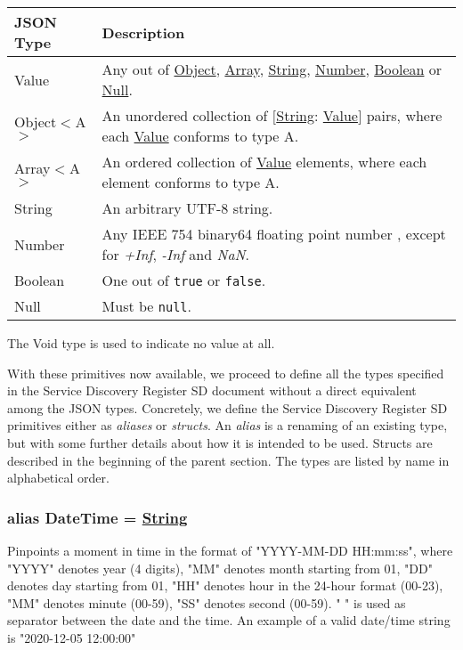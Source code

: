 \documentclass[a4paper]{arrowhead}
\newcommand{\pdef}[1]{{\textcolor{ArrowheadGrey}{#1\label{sec:model:primitives:#1}\label{sec:model:primitives:#1s}}}}
\newcommand{\pref}[1]{{\textcolor{ArrowheadGrey}{\hyperref[sec:model:primitives:#1]{#1}}}}
\begin{document}
\begin{table}[ht!]
\begin{tabularx}{\textwidth}{| p{3cm} | X |} \hline
\rowcolor{gray!33} JSON Type & Description \\ \hline
\pdef{Value}                 & Any out of \pref{Object}, \pref{Array}, \pref{String}, \pref{Number}, \pref{Boolean} or \pref{Null}. \\ \hline
\pdef{Object}$<$A$>$         & An unordered collection of $[$\pref{String}: \pref{Value}$]$ pairs, where each \pref{Value} conforms to type A. \\ \hline
\pdef{Array}$<$A$>$          & An ordered collection of \pref{Value} elements, where each element conforms to type A. \\ \hline
\pdef{String}                & An arbitrary UTF-8 string. \\ \hline
\pdef{Number}                & Any IEEE 754 binary64 floating point number \cite{cowlishaw2019floating}, except for \textit{+Inf}, \textit{-Inf} and \textit{NaN}. \\ \hline
\pdef{Boolean}               & One out of \texttt{true} or \texttt{false}. \\ \hline
\pdef{Null}                  & Must be \texttt{null}. \\ \hline
\end{tabularx}
\end{table}

The \pdef{Void} type is used to indicate no value at all.

With these primitives now available, we proceed to define all the types specified in the Service Discovery Register SD document without a direct equivalent among the JSON types.
Concretely, we define the Service Discovery Register SD primitives either as \textit{aliases} or \textit{structs}.
An \textit{alias} is a renaming of an existing type, but with some further details about how it is intended to be used.
Structs are described in the beginning of the parent section.
The types are listed by name in alphabetical order.

\subsubsection{alias \pdef{DateTime} = \pref{String}}

Pinpoints a moment in time in the format of "YYYY-MM-DD HH:mm:ss", where "YYYY" denotes year (4 digits), "MM" denotes month starting from 01, "DD" denotes day starting from 01, "HH" denotes hour in the 24-hour format (00-23), "MM" denotes minute (00-59), "SS" denotes second (00-59). " " is used as separator between the date and the time.
An example of a valid date/time string is "2020-12-05 12:00:00"
\end{document}
